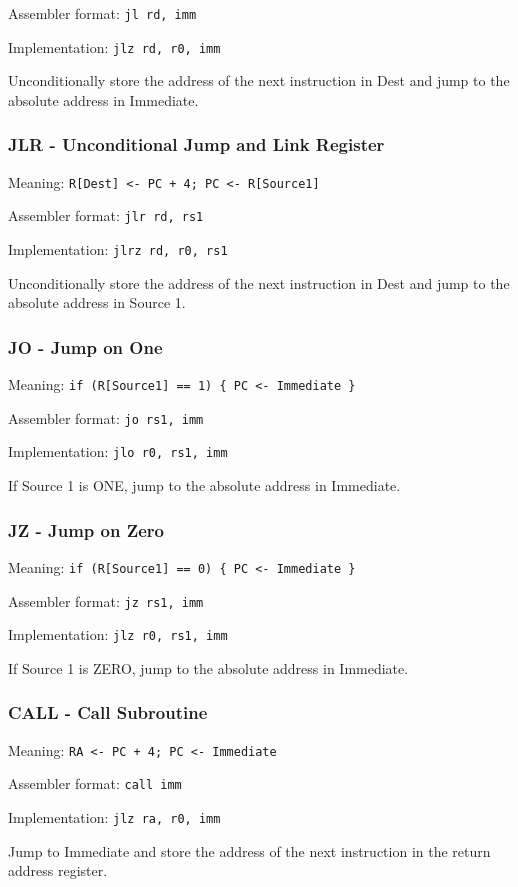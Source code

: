 \documentclass{article}
\begin{document}
Assembler format: \verb|jl rd, imm|

Implementation: \verb|jlz rd, r0, imm|

Unconditionally store the address of the next instruction in Dest and jump to the absolute
address in Immediate.

\subsubsection{JLR - Unconditional Jump and Link Register}
Meaning: \verb|R[Dest] <- PC + 4; PC <- R[Source1]|

Assembler format: \verb|jlr rd, rs1|

Implementation: \verb|jlrz rd, r0, rs1|

Unconditionally store the address of the next instruction in Dest and jump to the absolute
address in Source 1.

\subsubsection{JO - Jump on One}
Meaning: \verb|if (R[Source1] == 1) { PC <- Immediate }|

Assembler format: \verb|jo rs1, imm|

Implementation: \verb|jlo r0, rs1, imm|

If Source 1 is ONE, jump to the absolute address in Immediate.

\subsubsection{JZ - Jump on Zero}
Meaning: \verb|if (R[Source1] == 0) { PC <- Immediate }|

Assembler format: \verb|jz rs1, imm|

Implementation: \verb|jlz r0, rs1, imm|

If Source 1 is ZERO, jump to the absolute address in Immediate.

\subsubsection{CALL - Call Subroutine}
Meaning: \verb|RA <- PC + 4; PC <- Immediate|

Assembler format: \verb|call imm|

Implementation: \verb|jlz ra, r0, imm|

Jump to Immediate and store the address of the next instruction in the return address register.
\end{document}
